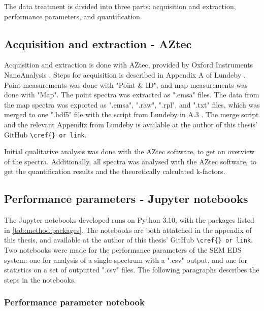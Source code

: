 The data treatment is divided into three parts: acquisition and extraction, performance parameters, and quantification.

\subsection{Acquisition and extraction - AZtec}
\label{method:data_treatment:aztec}

Acquisition and extraction is done with AZtec, provided by Oxford Instruments NanoAnalysis \cite{aztec_manual}.
Steps for acquisition is described in Appendix A of Lundeby \cite{lundeby_improving_2019}.
Point measurements was done with "Point \& ID", and map measurements was done with "Map".
The point spectra was extracted as ".emsa" files.
The data from the map spectra was exported as ".emsa", ".raw", ".rpl", and ".txt" files, which was merged to one ".hdf5" file with the script from Lundeby in A.3 \cite{lundeby_improving_2019}.
The merge script and the relevant Appendix from Lundeby is available at the author of this thesis' GitHub \verb|\cref{} or link|.


Initial qualitative analysis was done with the AZtec software, to get an overview of the spectra.
Additionally, all spectra was analysed with the AZtec software, to get the quantification results and the theoretically calculated k-factors.



\subsection{Performance parameters - Jupyter notebooks}
\label{method:data_treatment:notebook}

The Jupyter notebooks developed runs on Python 3.10, with the packages listed in \cref{tab:method:packages}.
The notebooks are both attatched in the appendix of this thesis, and available at the author of this thesis' GitHub \verb|\cref{} or link|.
Two notebooks were made for the performance parameters of the SEM EDS system: one for analysis of a single spectrum with a ".csv" output, and one for statistics on a set of outputted ".csv" files.
The following paragraphs describes the steps in the notebooks.




\subsubsection{Performance parameter notebook}
\label{method:data_treatment:notebook:performance}

